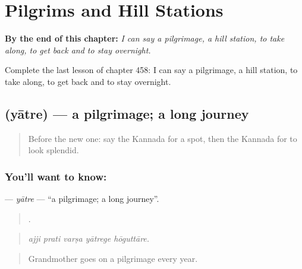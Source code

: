 
\chapter{Pilgrims and Hill Stations}
\label{ch:ka-pilgrims-and-hill-stations}

\begin{chapteropening}
\textbf{By the end of this chapter:} \emph{I can say a pilgrimage, a hill station, to take along, to get back and to stay overnight.}

Complete the last lesson of chapter 458: I can say a pilgrimage, a hill station, to take along, to get back and to stay overnight.
\end{chapteropening}

\section[\texorpdfstring{\kn{ಯಾತ್ರೆ} (yātre)}{ಯಾತ್ರೆ (yātre)}]{ (yātre) — a pilgrimage; a long journey}

\label{lesson:KA-C458-yatre}



\begin{quote}
Before the new one: say the Kannada for a spot, then the Kannada for to look splendid.
\end{quote}

\subsection*{You'll want to know: }
\textbf{} — \emph{yātre} — \textquotedblleft{}a pilgrimage; a long journey\textquotedblright{}.

\begin{quote}
    .
\end{quote}

\begin{quote}
\emph{ajji prati varṣa yātrege hōguttāre.}
\end{quote}

\begin{quote}
Grandmother goes on a pilgrimage every year.
\end{quote}


